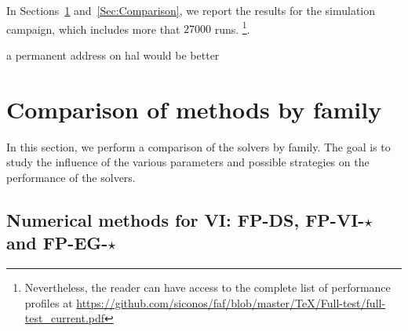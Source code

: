 In Sections~\ref{Sec:ComparisonFamily} and~\ref{Sec:Comparison}, we report the results for the simulation campaign, which includes more that $27000$ runs.
\footnote{Nevertheless, the reader can have access to the complete list of performance profiles at \href{https://github.com/siconos/faf/blob/master/TeX/Full-test/full-test_current.pdf}{https://github.com/siconos/faf/blob/master/TeX/Full-test/full-test\_current.pdf}}.


\begin{ndrva}
 a permanent address on hal  would be better
\end{ndrva}




\newcommand\commentedfigure[1]{}


\makeatletter
\def\subfigcounter{\thesubfigure}
\makeatother



\def\subfiglayout{%
  \captionsetup[subfloat]{farskip=-0pt,captionskip=-2pt,font=scriptsize}%
  \setlength{\abovecaptionskip}{0pt}}
\def\measurename{time}
\def\performance{time}
\def\widthfigure{0.6}
\def\figwidth{0.50\textwidth}
\def\legendwidth{0.6\textwidth}
\def\legendheight{0.15\textheight}

\section{Comparison of methods by family}
\label{Sec:ComparisonFamily}
In this section, we perform a comparison of the solvers by family. The goal is  to study the influence of the various parameters and possible strategies on the performance of the solvers.

\subsection{Numerical methods for VI: {\sf FP-DS, FP-VI-$\star$} and {\sf FP-EG-$\star$}}
\label{Sec:Comparison,VI,step-length}


